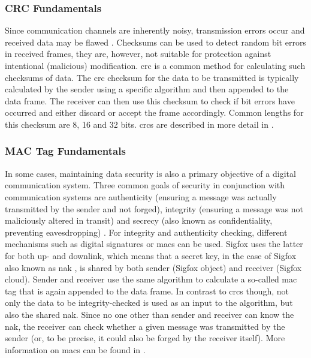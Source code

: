 \subsubsection{CRC Fundamentals}
Since communication channels are inherently noisy, transmission errors occur and received data may be flawed \cite[Section 1.2.4]{ecctechniques}.
Checksums can be used to detect random bit errors in received frames, they are, however, not suitable for protection against intentional (malicious) modification.
\Gls{crc} is a common method for calculating such checksums of data.
The \gls{crc} checksum for the data to be transmitted is typically calculated by the sender using a specific algorithm and then appended to the data frame.
The receiver can then use this checksum to check if bit errors have occurred and either discard or accept the frame accordingly.
Common lengths for this checksum are 8, 16 and 32 bits.
\glspl{crc} are described in more detail in .

\subsubsection{MAC Tag Fundamentals}
In some cases, maintaining data security is also a primary objective of a digital communication system.
Three common goals of security in conjunction with communication systems are authenticity (ensuring a message was actually transmitted by the sender and not forged), integrity (ensuring a message was not maliciously altered in transit) and secrecy (also known as confidentiality, preventing eavesdropping) \cite[chapter 13, introduction]{carlson_commsys}.
For integrity and authenticity checking, different mechanisms such as digital signatures or \glspl{mac} can be used.
Sigfox uses the latter for both up- and downlink, which means that a secret key, in the case of Sigfox also known as \gls{nak} \cite[Section 2.2.2]{sigfox_secure}, is shared by both sender (Sigfox object) and receiver (Sigfox cloud).
Sender and receiver use the same algorithm to calculate a so-called \gls{mac} tag that is again appended to the data frame.
In contrast to \glspl{crc} though, not only the data to be integrity-checked is used as an input to the algorithm, but also the shared \gls{nak}.
Since no one other than sender and receiver can know the \gls{nak}, the receiver can check whether a given message was transmitted by the sender (or, to be precise, it could also be forged by the receiver itself).
More information on \glspl{mac} can be found in .


